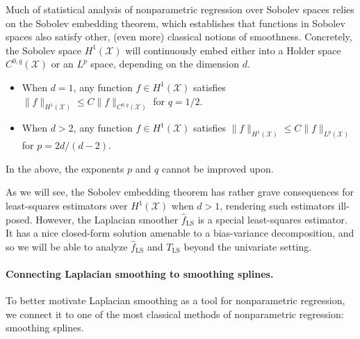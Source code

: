 \documentclass[twoside]{article}
\newcommand{\1}{\mathbf{1}}
\newcommand{\Xset}{\mathcal{X}}
\newcommand{\Leb}{L}
\newcommand{\wh}[1]{\widehat{#1}}
\newcommand{\LS}{\mathrm{LS}}
\theoremstyle{definition}
\theoremstyle{remark}
\begin{document}
Much of statistical analysis of nonparametric regression over Sobolev spaces relies on the Sobolev embedding theorem, which establishes that functions in Sobolev spaces also satisfy other, (even more) classical notions of smoothness. Concretely, the Sobolev space $H^1(\Xset)$ will continuously embed either into a Holder space $C^{0,q}(\Xset)$ or an $\Leb^p$ space, depending on the dimension $d$.
\begin{itemize}
	\item When $d = 1$, any function $f \in H^1(\Xset)$ satisfies $\|f\|_{H^1(\Xset)} \leq C\|f\|_{C^{0,q}(\Xset)}$ for $q = 1/2.$
	\item When $d > 2$, any function $f \in H^1(\Xset)$ satisfies $\|f\|_{H^1(\Xset)} \leq C\|f\|_{\Leb^{p}(\Xset)}$ for $p = 2d/(d - 2)$. 
\end{itemize}
In the above, the exponents $p$ and $q$ cannot be improved upon. 



As we will see, the Sobolev embedding theorem has rather grave consequences for least-squares estimators over $H^1(\Xset)$ when $d > 1$, rendering such estimators ill-posed. However, the Laplacian smoother $\wh{f}_{\LS}$ is a special least-squares estimator. It has a nice closed-form solution amenable to a bias-variance decomposition, and so we will be able to analyze $\wh{f}_{\LS}$ and $T_{\LS}$ beyond the univariate setting.

\paragraph{Connecting Laplacian smoothing to smoothing splines.} 
To better motivate Laplacian smoothing as a tool for nonparametric regression, we connect it to one of the most classical methods of nonparametric regression: smoothing splines.
\end{document}
